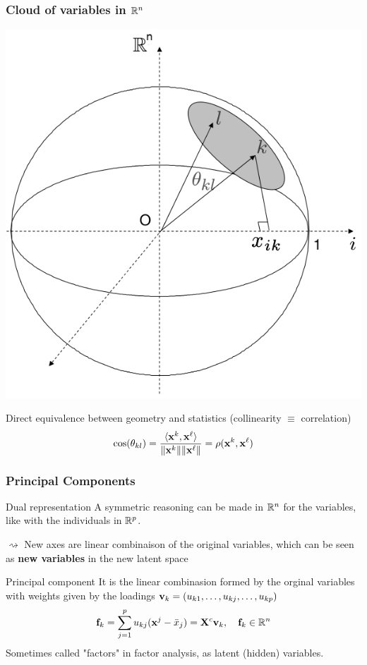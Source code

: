 \documentclass{beamer}\usepackage[]{graphicx}\usepackage[]{color}
\begin{document}
\begin{frame}
  \frametitle{Cloud of variables in $\mathbb{R}^n$}
  
  \begin{center}
    \includegraphics[width=.45\textwidth]{nuage_var}
  \end{center}

  Direct equivalence between geometry and statistics (collinearity $\equiv$ correlation) 
  \begin{equation*}
    \cos(\theta_{kl}) = \frac{\langle \mathbf{x}^k ,\mathbf{x}^\ell \rangle}{\|\mathbf{x}^k\| \|\mathbf{x}^\ell\|} = \rho(\mathbf{x}^k,\mathbf{x}^\ell)
  \end{equation*}

\end{frame}

\begin{frame}
  \frametitle{Principal Components}
  
  \begin{block}{Dual representation}
    A symmetric reasoning can be made in $\mathbb{R}^n$ for the variables, like with the individuals in $\mathbb{R}^p$.
    
    $\rightsquigarrow$ New axes are linear combinaison of the original variables, which can be seen as \alert{\bf new variables} in the new latent space
  \end{block}

  \begin{block}{Principal component}
    It is the linear combinasion formed by the orginal variables with weights given by the loadings $\mathbf{v}_k = (u_{k1}, \dots, u_{kj}, \dots, u_{kp})$
    \begin{equation*}
      \mathbf{f}_{k}  = \sum_{j=1}^p u_{kj} (\mathbf{x}^{j} - \bar{x}_j) = \mathbf{X}^c \mathbf{v}_k, \quad \mathbf{f}_k \in \mathbb{R}^n
    \end{equation*}
    Sometimes called \alert{"factors"} in  factor analysis, as \alert{latent (hidden) variables}. 
  \end{block}

\end{frame}
\end{document}
